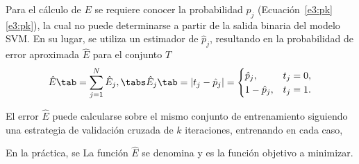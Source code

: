 Para el cálculo de $E$ se requiere conocer la probabilidad $p_j$
(\iflatexml{}Ecuación~\ref{e3:pk}\else\autoref{e3:pk}\fi), la cual no
puede determinarse a partir de la salida binaria del modelo SVM.  En
su lugar, se utiliza un estimador de $\hat{p}_j$, resultando en la
probabilidad de error aproximada $\hat{E}$ para el conjunto $T$
%
\begin{align}
  \label{Err1}
  \hat{E}\tab=\sum_{j=1}^{N}\hat{E}_j,\tabs
  \hat{E}_j\tab=|t_j-\hat{p}_j| =
  \begin{cases}
    \hat{p}_j,&t_j=0,\\1-\hat{p}_j,&t_j=1.
  \end{cases}
\end{align}
%

El error $\hat{E}$ puede calcularse sobre el mismo conjunto de entrenamiento
siguiendo una estrategia de validación cruzada de $k$ iteraciones, entrenando
en cada caso,

En la práctica, se
La función $\hat{E}$ se denomina  y es la función objetivo a
minimizar.
